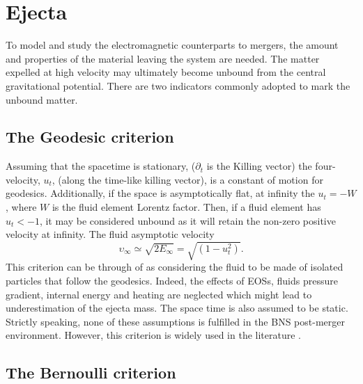 \section{Ejecta} \label{sec:bns_sims:method:ejecta}

To model and study the electromagnetic counterparts to mergers, the amount and properties 
of the material leaving the system are needed.
The matter expelled at high velocity may ultimately become unbound from the 
central gravitational potential. 
There are two indicators commonly adopted to mark the unbound matter.

\subsection{The Geodesic criterion}

Assuming that the spacetime is stationary, ($\partial_t$ is the Killing vector)%
the four-velocity, $u_t$, (along the time-like killing vector), 
is a constant of motion for geodesics. 
Additionally, if the space is asymptotically flat, at infinity the $u_t = -W$, 
where $W$ is the fluid element Lorentz factor. 
Then, if a fluid element has $u_t < -1$, it may be considered unbound 
as it will retain the non-zero positive velocity at infinity. 
%
The fluid asymptotic velocity 
\begin{equation}
\upsilon_{\infty} \simeq \sqrt{2E_{\infty}} = \sqrt{(1-u_t ^2)}.
\end{equation}
%
This criterion can be through of as considering the fluid to be made of isolated 
particles that follow the geodesics. Indeed, the effects of \acp{EOS}, 
fluids pressure gradient, internal energy and heating %
are neglected which might lead to 
underestimation of the ejecta mass. 
%
The space time is also assumed to be static.
%
Strictly speaking, none of these assumptions is 
fulfilled in the \ac{BNS} post-merger environment. However, this criterion 
is widely used in the literature \citep[\eg][]{Radice:2018pdn,Vincent:2019kor}.



\subsection{The Bernoulli criterion}


